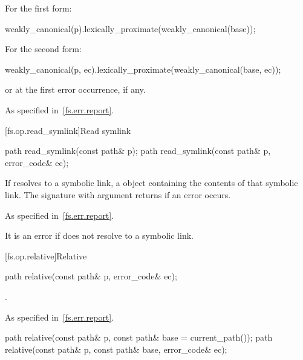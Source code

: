 \begin{itemdescr}
\pnum
\returns For the first form:
\begin{codeblock}
weakly_canonical(p).lexically_proximate(weakly_canonical(base));
\end{codeblock}
  For the second form:
\begin{codeblock}
weakly_canonical(p, ec).lexically_proximate(weakly_canonical(base, ec));
\end{codeblock}
  or  at the first error occurrence, if any.

\pnum
\throws As specified in~\ref{fs.err.report}.
\end{itemdescr}

[fs.op.read_symlink]{Read symlink}

%
\begin{itemdecl}
path read_symlink(const path& p);
path read_symlink(const path& p, error_code& ec);
\end{itemdecl}

\begin{itemdescr}
\pnum
\returns If  resolves to a symbolic
  link, a  object containing the contents of that symbolic
  link. The signature with argument 
  returns  if an error occurs.

\pnum
\throws As specified in~\ref{fs.err.report}. \begin{note} It is an error if  does not
  resolve to a symbolic link. \end{note}
\end{itemdescr}

[fs.op.relative]{Relative}

%
\begin{itemdecl}
path relative(const path& p, error_code& ec);
\end{itemdecl}

\begin{itemdescr}
\pnum
\returns {}.

\pnum
\throws As specified in~\ref{fs.err.report}.
\end{itemdescr}

%
\begin{itemdecl}
path relative(const path& p, const path& base = current_path());
path relative(const path& p, const path& base, error_code& ec);
\end{itemdecl}


